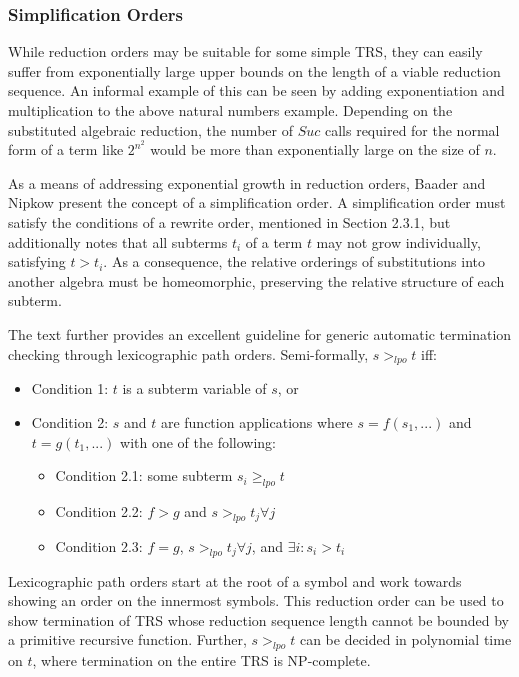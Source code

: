 \documentclass{article}
\begin{document}
\subsubsection{Simplification Orders}
While reduction orders may be suitable for some simple TRS, they can easily suffer from exponentially large upper bounds on the length of a viable reduction sequence.
An informal example of this can be seen by adding exponentiation and multiplication to the above natural numbers example.
Depending on the substituted algebraic reduction, the number of $Suc$ calls required for the normal form of a term like $2^{n^2}$ would be
more than exponentially large on the size of $n$.

As a means of addressing exponential growth in reduction orders, Baader and Nipkow \cite{baader1998term} present the concept of a simplification order.
A simplification order must satisfy the conditions of a rewrite order, mentioned in Section 2.3.1, but additionally notes that all subterms $t_i$ of a term $t$
may not grow individually, satisfying $t > t_i$. As a consequence, the relative orderings of substitutions into another algebra must be homeomorphic, preserving the relative
structure of each subterm.

The text further provides an excellent guideline for generic automatic termination checking through lexicographic path orders. Semi-formally, $s >_{lpo} t$ iff:
\begin{itemize}
    \item Condition 1: $t$ is a subterm variable of $s$, or
    \item Condition 2: $s$ and $t$ are function applications where $s = f(s_1, ...)$ and $t = g(t_1,...)$ with one of the following:
    \begin{itemize}
        \item Condition 2.1: some subterm $s_i \geq_{lpo} t$
        \item Condition 2.2: $f > g$ and $s >_{lpo} t_j \forall j$
        \item Condition 2.3: $f = g$, $s >_{lpo} t_j \forall j$, and $\exists i: s_i > t_i$
    \end{itemize}
\end{itemize}
Lexicographic path orders start at the root of a symbol and work towards showing an order on the innermost symbols.
This reduction order can be used to show termination of TRS whose reduction sequence length cannot be bounded by a primitive recursive function.
Further, $s >_{lpo} t$ can be decided in polynomial time on $t$, where termination on the entire TRS is NP-complete.
\end{document}
